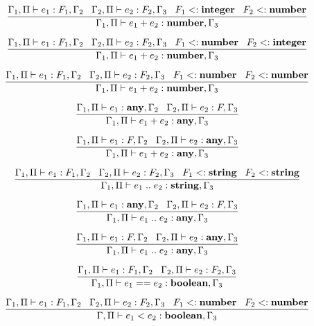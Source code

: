 \[
\dfrac{\Gamma_{1}, \Pi \vdash e_{1}:F_{1}, \Gamma_{2} \;\;\;
       \Gamma_{2}, \Pi \vdash e_{2}:F_{2}, \Gamma_{3} \;\;\;
       F_{1} <: \mathbf{integer} \;\;\;
       F_{2} <: \mathbf{number}}
      {\Gamma_{1}, \Pi \vdash e_{1} + e_{2}:\mathbf{number}, \Gamma_{3}}
\]

\[
\dfrac{\Gamma_{1}, \Pi \vdash e_{1}:F_{1}, \Gamma_{2} \;\;\;
       \Gamma_{2}, \Pi \vdash e_{2}:F_{2}, \Gamma_{3} \;\;\;
       F_{1} <: \mathbf{number} \;\;\;
       F_{2} <: \mathbf{integer}}
      {\Gamma_{1}, \Pi \vdash e_{1} + e_{2}:\mathbf{number}, \Gamma_{3}}
\]

\[
\dfrac{\Gamma_{1}, \Pi \vdash e_{1}:F_{1}, \Gamma_{2} \;\;\;
       \Gamma_{2}, \Pi \vdash e_{2}:F_{2}, \Gamma_{3} \;\;\;
       F_{1} <: \mathbf{number} \;\;\;
       F_{2} <: \mathbf{number}}
      {\Gamma_{1}, \Pi \vdash e_{1} + e_{2}:\mathbf{number}, \Gamma_{3}}
\]

\[
\dfrac{\Gamma_{1}, \Pi \vdash e_{1}:\mathbf{any}, \Gamma_{2} \;\;\;
       \Gamma_{2}, \Pi \vdash e_{2}:F, \Gamma_{3}}
      {\Gamma_{1}, \Pi \vdash e_{1} + e_{2}:\mathbf{any}, \Gamma_{3}}
\]

\[
\dfrac{\Gamma_{1}, \Pi \vdash e_{1}:F, \Gamma_{2} \;\;\;
       \Gamma_{2}, \Pi \vdash e_{2}:\mathbf{any}, \Gamma_{3}}
      {\Gamma_{1}, \Pi \vdash e_{1} + e_{2}:\mathbf{any}, \Gamma_{3}}
\]

\[
\dfrac{\Gamma_{1}, \Pi \vdash e_{1}:F_{1}, \Gamma_{2} \;\;\;
       \Gamma_{2}, \Pi \vdash e_{2}:F_{2}, \Gamma_{3} \;\;\;
       F_{1} <: \mathbf{string} \;\;\;
       F_{2} <: \mathbf{string}}
      {\Gamma_{1}, \Pi \vdash e_{1} \; {..} \; e_{2}:\mathbf{string}, \Gamma_{3}}
\]

\[
\dfrac{\Gamma_{1}, \Pi \vdash e_{1}:\mathbf{any}, \Gamma_{2} \;\;\;
       \Gamma_{2}, \Pi \vdash e_{2}:F, \Gamma_{3}}
      {\Gamma_{1}, \Pi \vdash e_{1} \; {..} \; e_{2}:\mathbf{any}, \Gamma_{3}}
\]

\[
\dfrac{\Gamma_{1}, \Pi \vdash e_{1}:F, \Gamma_{2} \;\;\;
       \Gamma_{2}, \Pi \vdash e_{2}:\mathbf{any}, \Gamma_{3}}
      {\Gamma_{1}, \Pi \vdash e_{1} \; {..} \; e_{2}:\mathbf{any}, \Gamma_{3}}
\]

\[
\dfrac{\Gamma_{1}, \Pi \vdash e_{1}:F_{1}, \Gamma_{2} \;\;\;
       \Gamma_{2}, \Pi \vdash e_{2}:F_{2}, \Gamma_{3}}
      {\Gamma_{1}, \Pi \vdash e_{1} == e_{2}:\mathbf{boolean}, \Gamma_{3}}
\]

\[
\dfrac{\Gamma_{1}, \Pi \vdash e_{1}:F_{1}, \Gamma_{2} \;\;\;
       \Gamma_{2}, \Pi \vdash e_{2}:F_{2}, \Gamma_{3} \;\;\;
       F_{1} <: \mathbf{number} \;\;\;
       F_{2} <: \mathbf{number}}
      {\Gamma, \Pi \vdash e_{1} < e_{2}:\mathbf{boolean}, \Gamma_{3}}
\]

